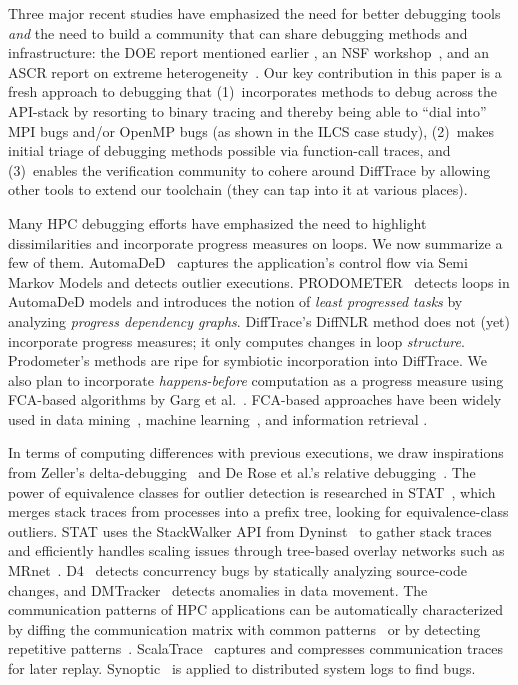 Three major recent studies
have emphasized the need for better debugging tools
{\em and} the need to build a community that can share debugging
methods and infrastructure: the DOE report mentioned
earlier \cite{hpcdoe},
an NSF workshop~\cite{Cohen:2018:IRC:3297279}, and an ASCR report on
extreme heterogeneity~\cite{ascr-report-extreme-heterogeneity}.
%
Our key contribution in this paper is a fresh approach to debugging
that (1)~incorporates methods to debug across the API-stack
by resorting to binary tracing and thereby being able to ``dial into''
MPI bugs and/or OpenMP bugs (as shown in the ILCS case study), (2)~makes
initial triage of debugging methods possible via function-call traces,
and (3)~enables the verification community to cohere around DiffTrace
by allowing other tools to extend our toolchain (they can tap into it at various places).


Many HPC debugging efforts have emphasized
the need to highlight dissimilarities and
incorporate progress measures on loops. We now
summarize a few of them.
%
AutomaDeD~\cite{automaded-GBron}\cite{automaded-laguna}
captures the application's control flow
via Semi Markov Models and detects outlier executions.
%
PRODOMETER~\cite{prodometer} detects loops in
AutomaDeD models and introduces the
notion of {\em least progressed tasks} by analyzing {\em progress dependency graphs}.
%
DiffTrace's DiffNLR method does not (yet) incorporate progress measures; it only
computes changes in loop {\em structure}.
%
Prodometer's methods are ripe for symbiotic incorporation into DiffTrace.
%
We also plan to incorporate {\em happens-before} computation as a progress measure using FCA-based algorithms by Garg et al.~\cite{latticeForDistConst,garg_2015}.
%
FCA-based approaches have been widely used in data mining~\cite{cldm},
machine learning~\cite{clml}, and information retrieval \cite{ignatov17}.


In terms of computing differences with previous executions,
we draw inspirations from
Zeller's delta-debugging~\cite{DBLP:conf/esec/Zeller99}
and De Rose et al.'s relative debugging~\cite{relative-debugging}.
%
The power of equivalence classes for outlier detection is
researched in STAT~\cite{stat}, which
merges stack traces from processes into a prefix tree,
looking for equivalence-class outliers.
%
STAT uses the StackWalker API from Dyninst~\cite{dyninst} to gather stack traces
and efficiently handles scaling issues
through tree-based overlay networks such as MRnet~\cite{mrnet}.
%
D4~\cite{liu-18} detects concurrency bugs by statically analyzing source-code
changes, and DMTracker~\cite{dmtracker} detects anomalies in data movement.
%
The communication patterns of HPC applications can be automatically characterized by
diffing the communication matrix with common patterns~\cite{roth-15} or by
detecting repetitive patterns~\cite{preissl-08}.
%
ScalaTrace~\cite{scalatrace} captures and compresses communication traces for later replay. 
%
Synoptic~\cite{beschastnikh-synoptic} is applied to distributed
system logs to find bugs.
%

